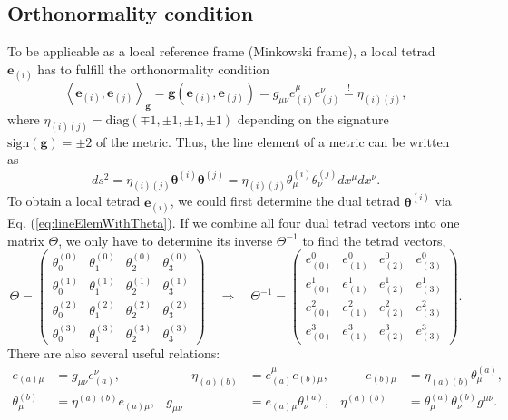 \documentclass[10pt,twoside,notitlepage,a4paper,fleqn,openbib]{report}
\def\sign{\textrm{sign}}
\begin{document}
\subsection{Orthonormality condition}
To be applicable as a local reference frame (Minkowski frame), a local tetrad $\mathbf{e}_{(i)}$ has to fulfill the orthonormality condition
\begin{equation}
  \left<\mathbf{e}_{(i)},\mathbf{e}_{(j)}\right>_{\mathbf{g}} = \mathbf{g}\left(\mathbf{e}_{(i)},\mathbf{e}_{(j)}\right) = g_{\mu\nu}e_{(i)}^{\mu}e_{(j)}^{\nu} \stackrel{!}{=} \eta_{(i)(j)},
\end{equation}
where $\eta_{(i)(j)}=\mathrm{diag}(\mp 1,\pm 1,\pm 1,\pm 1)$ depending on the signature $\sign(\mathbf{g})=\pm 2$ of the metric. Thus, the line element of a metric can be written as
\begin{equation}
  \label{eq:lineElemWithTheta}
  ds^2 = \eta_{(i)(j)}\boldsymbol{\theta}^{(i)}\boldsymbol{\theta}^{(j)} = \eta_{(i)(j)}\theta^{(i)}_{\mu}\theta^{(j)}_{\nu}dx^{\mu}dx^{\nu}.
\end{equation}
To obtain a local tetrad $\mathbf{e}_{(i)}$, we could first determine the dual tetrad $\boldsymbol{\theta}^{(i)}$ via Eq. (\ref{eq:lineElemWithTheta}). If we combine all four dual tetrad vectors into one matrix $\Theta$, we only have to determine its inverse $\Theta^{-1}$ to find the tetrad vectors,
\begin{equation}
 \Theta = \begin{pmatrix} \theta_0^{(0)} & \theta_1^{(0)} & \theta_2^{(0)} & \theta_3^{(0)} \\ \theta_0^{(1)} & \theta_1^{(1)} & \theta_2^{(1)} & \theta_3^{(1)} \\ \theta_0^{(2)} & \theta_1^{(2)} & \theta_2^{(2)} & \theta_3^{(2)} \\ \theta_0^{(3)} & \theta_1^{(3)} & \theta_2^{(3)} & \theta_3^{(3)}  \end{pmatrix} \quad\Rightarrow\quad \Theta^{-1} = \begin{pmatrix} e_{(0)}^0 & e_{(1)}^0 & e_{(2)}^0 & e_{(3)}^0 \\ e_{(0)}^1 & e_{(1)}^1 & e_{(2)}^1 & e_{(3)}^1 \\ e_{(0)}^2 & e_{(1)}^2 & e_{(2)}^2 & e_{(3)}^2 \\ e_{(0)}^3 & e_{(1)}^3 & e_{(2)}^3 & e_{(3)}^3  \end{pmatrix}.
\end{equation}
There are also several useful relations:
\begin{subequations}
\begin{alignat}{5}
  e_{(a)\mu} &= g_{\mu\nu}e_{(a)}^{\nu}, &\qquad \eta_{(a)(b)} &= e_{(a)}^{\mu}e_{(b)\mu}, &\qquad e_{(b)\mu} &= \eta_{(a)(b)}\theta_{\mu}^{(a)},\\
  \theta_{\mu}^{(b)} &= \eta^{(a)(b)}e_{(a)\mu}, & g_{\mu\nu} &= e_{(a)\mu}\theta_{\nu}^{(a)}, & \eta^{(a)(b)} &= \theta_{\mu}^{(a)}\theta_{\nu}^{(b)}g^{\mu\nu}.
\end{alignat}
\end{subequations}
\end{document}
